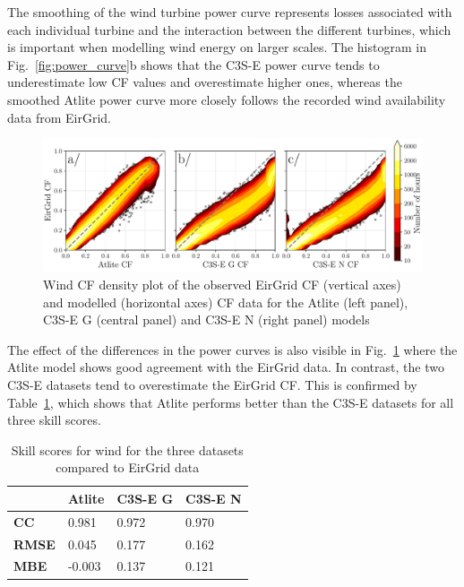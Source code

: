 \documentclass[a4paper, 11pt]{article}
\begin{document}
The smoothing of the wind turbine power curve represents losses associated with each individual turbine and the interaction between the different turbines, which is important when modelling wind energy on larger scales. The histogram in Fig.~\ref{fig:power_curve}b shows that the C3S-E power curve tends to underestimate low CF values and overestimate higher ones, whereas the smoothed Atlite power curve more closely follows the recorded wind availability data from EirGrid.

\begin{figure}[!ht]
	\centering
	\includegraphics[width=\textwidth]{verification_wind_contour}
	\caption{Wind CF density plot of the observed EirGrid CF (vertical axes) and modelled (horizontal axes) CF data for the Atlite  (left panel), C3S-E G (central panel) and C3S-E N (right panel) models}
	\label{fig:wind_verification_contour}
\end{figure}

The effect of the differences in the power curves is also visible in Fig.~\ref{fig:wind_verification_contour} where the Atlite model shows good agreement with the EirGrid data. In contrast, the two C3S-E datasets tend to overestimate the EirGrid CF. This is confirmed by Table~\ref{tab:wind_skill_scores}, which shows that Atlite performs better than the C3S-E datasets for all three skill scores. 

\begin{table}[!ht]
	\centering
	\begin{tabular}{l|lll|}
		\cline{2-4}
		& \textbf{Atlite} & \textbf{C3S-E G} & \textbf{C3S-E N} \\ \hline
		\multicolumn{1}{|l|}{\textbf{CC}}   & 0.981           & 0.972            & 0.970            \\ \hline
		\multicolumn{1}{|l|}{\textbf{RMSE}} & 0.045           & 0.177            & 0.162            \\ \hline
		\multicolumn{1}{|l|}{\textbf{MBE}}   & -0.003          & 0.137            & 0.121            \\ \hline
	\end{tabular}
	\caption{Skill scores for wind for the three datasets compared to EirGrid data}
	\label{tab:wind_skill_scores}
\end{table}
\end{document}
